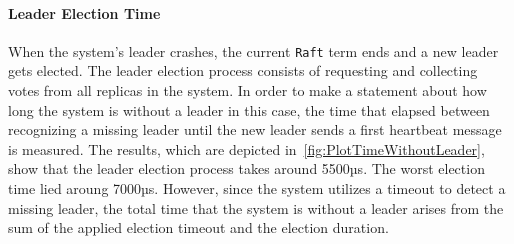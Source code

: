 
\paragraph{Leader Election Time}
When the system's leader crashes, the current \texttt{Raft} term ends and a new leader gets elected.
The leader election process consists of requesting and collecting votes from all replicas in the system.
In order to make a statement about how long the system is without a leader in this case, the time that elapsed between recognizing a missing leader until the new leader sends a first heartbeat message is measured.
The results, which are depicted in~\autoref{fig:PlotTimeWithoutLeader}, show that the leader election process takes around 5500µs.
The worst election time lied aroung 7000µs.
However, since the system utilizes a timeout to detect a missing leader, the total time that the system is without a leader arises from the sum of the applied election timeout and the election duration.

